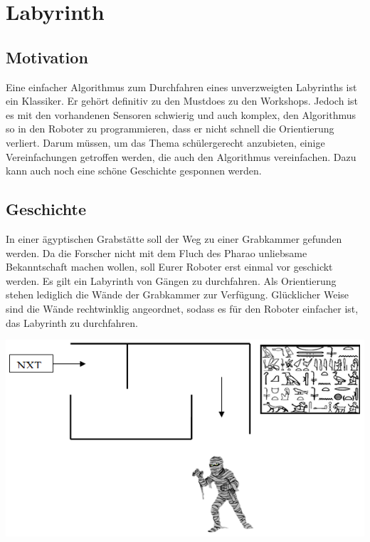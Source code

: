 \chapter{Labyrinth}

  \section{Motivation}
    Eine einfacher Algorithmus zum Durchfahren eines unverzweigten Labyrinths ist ein Klassiker. Er gehört definitiv zu den Mustdoes zu den Workshops. Jedoch ist es mit den vorhandenen Sensoren schwierig und auch komplex, den Algorithmus so in den Roboter zu programmieren, dass er nicht schnell die Orientierung verliert. Darum müssen, um das Thema schülergerecht anzubieten, einige Vereinfachungen getroffen werden, die auch den Algorithmus vereinfachen. Dazu kann auch noch eine schöne Geschichte gesponnen werden. 

  \section{Geschichte}
    In einer ägyptischen Grabstätte soll der Weg zu einer Grabkammer gefunden werden. Da die Forscher nicht mit dem Fluch des Pharao unliebsame Bekanntschaft machen wollen, soll Eurer Roboter erst einmal vor geschickt werden. Es gilt ein Labyrinth von Gängen zu durchfahren. Als Orientierung stehen lediglich die Wände der Grabkammer zur Verfügung. Glücklicher Weise sind die Wände rechtwinklig angeordnet, sodass es für den Roboter einfacher ist, das Labyrinth zu durchfahren. 

    \begin{capfigure}[Labyrinth]
      \includegraphics[width=\textwidth]{images/labyrinth}
    \end{capfigure}

